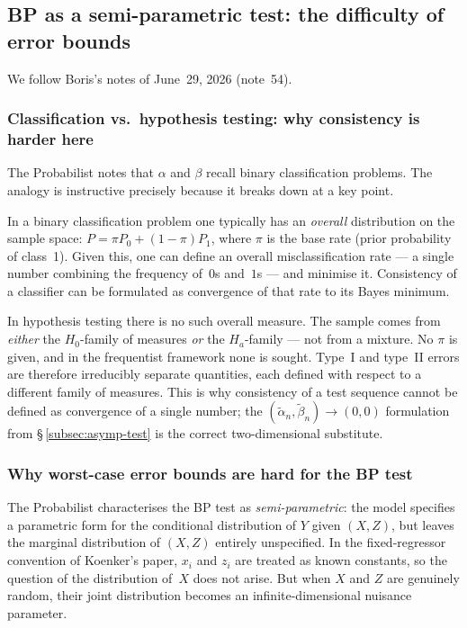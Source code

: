 \documentclass[a4paper,oneside,12pt]{extarticle}
\theoremstyle{plain}
\theoremstyle{definition}
\theoremstyle{remark}
\begin{document}

\subsection{BP as a semi-parametric test: the difficulty of error bounds}
\label{subsec:semipar}

We follow Boris's notes of June~29, 2026 (note~54).

\subsubsection*{Classification vs.\ hypothesis testing: why consistency is harder here}

The Probabilist notes that $\alpha$ and $\beta$ recall binary classification problems.
The analogy is instructive precisely because it breaks down at a key
point.

In a binary classification problem one typically has an \emph{overall}
distribution on the sample space: $P = \pi P_0 + (1-\pi)P_1$, where
$\pi$ is the base rate (prior probability of class~1).  Given this, one
can define an overall misclassification rate — a single number combining
the frequency of~$0$s and~$1$s — and minimise it.  Consistency of a
classifier can be formulated as convergence of that rate to its Bayes
minimum.

In hypothesis testing there is no such overall measure.  The sample
comes from \emph{either} the $H_0$-family of measures \emph{or} the
$H_a$-family — not from a mixture.  No $\pi$ is given, and in the
frequentist framework none is sought.  Type~I and type~II errors are
therefore irreducibly separate quantities, each defined with respect to
a different family of measures.  This is why consistency of a test
sequence cannot be defined as convergence of a single number; the
$(\tilde\alpha_n, \tilde\beta_n) \to (0,0)$ formulation from
§\,\ref{subsec:asymp-test} is the correct two-dimensional substitute.

\subsubsection*{Why worst-case error bounds are hard for the BP test}

The Probabilist characterises the BP test as \emph{semi-parametric}: the model
specifies a parametric form for the conditional distribution of $Y$
given $(X,Z)$, but leaves the marginal distribution of $(X,Z)$
entirely unspecified.  In the fixed-regressor convention of Koenker's
paper, $x_i$ and $z_i$ are treated as known constants, so the question
of the distribution of~$X$ does not arise.  But when $X$ and $Z$ are
genuinely random, their joint distribution becomes an
infinite-dimensional nuisance parameter.
\end{document}
